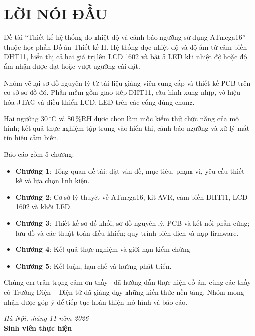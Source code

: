 \chapter*{LỜI NÓI ĐẦU}

Đề tài ``Thiết kế hệ thống đo nhiệt độ và cảnh báo ngưỡng sử dụng ATmega16'' thuộc học phần Đồ án Thiết kế II. Hệ thống đọc nhiệt độ và độ ẩm từ cảm biến DHT11, hiển thị cả hai giá trị lên LCD 1602 và bật 5 LED khi nhiệt độ hoặc độ ẩm nhận được đạt hoặc vượt ngưỡng cài đặt.

Nhóm vẽ lại sơ đồ nguyên lý từ tài liệu giảng viên cung cấp và thiết kế PCB trên cơ sở sơ đồ đó. Phần mềm gồm giao tiếp DHT11, cấu hình xung nhịp, vô hiệu hóa JTAG và điều khiển LCD, LED trên các cổng dùng chung.

Hai ngưỡng 30\,$^\circ$C và 80\,\%RH được chọn làm mốc kiểm thử chức năng của mô hình; kết quả thực nghiệm tập trung vào hiển thị, cảnh báo ngưỡng và xử lý mất tín hiệu cảm biến.

Báo cáo gồm 5 chương:
\begin{itemize}[leftmargin=1.5cm]
    \item \textbf{Chương 1}: Tổng quan đề tài: đặt vấn đề, mục tiêu, phạm vi, yêu cầu thiết kế và lựa chọn linh kiện.
    \item \textbf{Chương 2}: Cơ sở lý thuyết về ATmega16, kit AVR, cảm biến DHT11, LCD 1602 và khối LED.
    \item \textbf{Chương 3}: Thiết kế sơ đồ khối, sơ đồ nguyên lý, PCB và kết nối phần cứng; lưu đồ và các thuật toán điều khiển; quy trình biên dịch và nạp firmware.
    \item \textbf{Chương 4}: Kết quả thực nghiệm và giới hạn kiểm chứng.
    \item \textbf{Chương 5}: Kết luận, hạn chế và hướng phát triển.
\end{itemize}

Chúng em trân trọng cảm ơn thầy \UniversitySupervisor\ đã hướng dẫn thực hiện đồ án, cùng các thầy cô Trường Điện -- Điện tử đã giảng dạy những kiến thức nền tảng. Nhóm mong nhận được góp ý để tiếp tục hoàn thiện mô hình và báo cáo.

\vspace{0.4cm}
\begin{samepage}
\begin{flushright}
  \textit{Hà Nội, tháng 11 năm 2026}\\[0.15cm]
  \textbf{Sinh viên thực hiện}\\[0.4cm]
  \textbf{\StudentNameOne}\\[0.2cm]
  \textbf{\StudentNameTwo}
\end{flushright}
\end{samepage}
